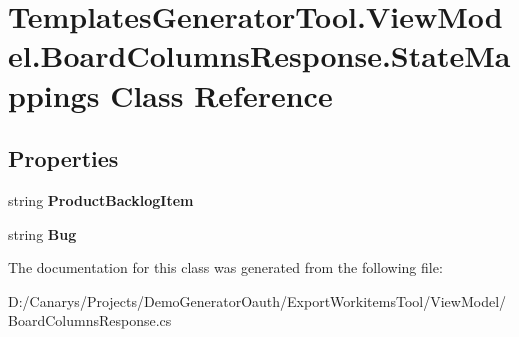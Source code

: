 \hypertarget{class_templates_generator_tool_1_1_view_model_1_1_board_columns_response_1_1_state_mappings}{}\section{Templates\+Generator\+Tool.\+View\+Model.\+Board\+Columns\+Response.\+State\+Mappings Class Reference}
\label{class_templates_generator_tool_1_1_view_model_1_1_board_columns_response_1_1_state_mappings}
\subsection*{Properties}
\begin{DoxyCompactItemize}
\item 
\mbox{\label{class_templates_generator_tool_1_1_view_model_1_1_board_columns_response_1_1_state_mappings_ae2c3f6908dfb93d41dc33f0e2e8dd020}} 
string {\bfseries Product\+Backlog\+Item}
\item 
\mbox{\label{class_templates_generator_tool_1_1_view_model_1_1_board_columns_response_1_1_state_mappings_ab771adeb48d98e2f803ed3596ad9a115}} 
string {\bfseries Bug}
\end{DoxyCompactItemize}


The documentation for this class was generated from the following file\+:\begin{DoxyCompactItemize}
\item 
D\+:/\+Canarys/\+Projects/\+Demo\+Generator\+Oauth/\+Export\+Workitems\+Tool/\+View\+Model/Board\+Columns\+Response.\+cs\end{DoxyCompactItemize}
